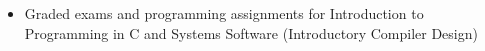
\begin{itemize}
    \item Graded exams and programming assignments for Introduction to Programming in C and Systems Software (Introductory Compiler Design)
\end{itemize}
 
